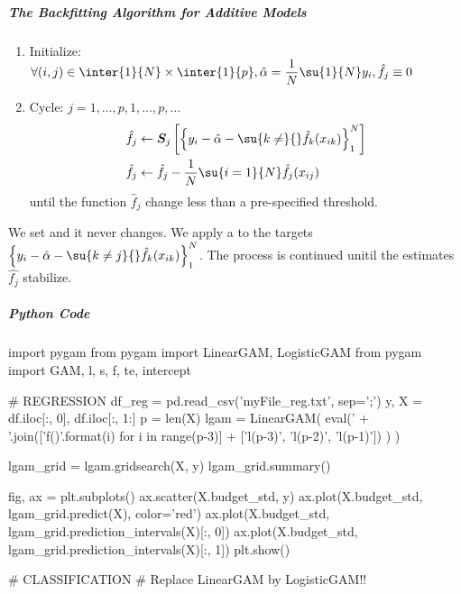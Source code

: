 \subparagraph{The Backfitting Algorithm for Additive Models}
\begin{enumerate}
	\item Initialize: $\forall (i,j)\in\inter{1}{N}\times\inter{1}{p}, \hat{\alpha} = \dfrac{1}{N}\su{{1}}{N}y_{i}, \hat{f}_{j}\equiv 0$
	\item Cycle: $j=1,\dots,p,1,\dots,p,\dots$
		\begin{align*}
			\hat{f}_{j} &\leftarrow \bm{S}_{j}\left[\left\{y_{i}-\hat{\alpha}-
			\su{{k\neq}}{}\hat{f}_{k}(x_{ik})\right\}_{1}^{N}\right]\\
			\hat{f}_{j} &\leftarrow \hat{f}_{j}-\dfrac{1}{N}\su{{i=1}}{N}\hat{f}_{j}(x_{ij})
		\end{align*}
		until the function $\hat{f}_{j}$ change less than a pre-specified threshold.
\end{enumerate}
We set  and it never changes. We apply a  to the targets $\left\{y_{i}-\hat{\alpha}-\su{{k\neq j}}{}\hat{f}_{k}(x_{ik})\right\}_{1}^{N
}$. The process is continued unitil the estimates $\hat{f_{j}}$ stabilize.\\ 

\subparagraph{Python Code}
\begin{python}
import pygam
from pygam import LinearGAM, LogisticGAM
from pygam import GAM, l, s, f, te, intercept


# REGRESSION
df_reg = pd.read_csv('myFile_reg.txt', sep=';')
y, X = df.iloc[:, 0], df.iloc[:, 1:]
p = len(X)
lgam = LinearGAM(
   eval(' + '.join(['f({})'.format(i) 
       for i in range(p-3)] +
       ['l(p-3)', 'l(p-2)', 'l(p-1)'])
       )
)

lgam_grid = lgam.gridsearch(X, y)
lgam_grid.summary()

fig, ax = plt.subplots()
ax.scatter(X.budget_std, y)
ax.plot(X.budget_std, lgam_grid.predict(X), color='red')
ax.plot(X.budget_std, lgam_grid.prediction_intervals(X)[:, 0])
ax.plot(X.budget_std, lgam_grid.prediction_intervals(X)[:, 1])
plt.show()



# CLASSIFICATION
# Replace LinearGAM by LogisticGAM!!

\end{python}

